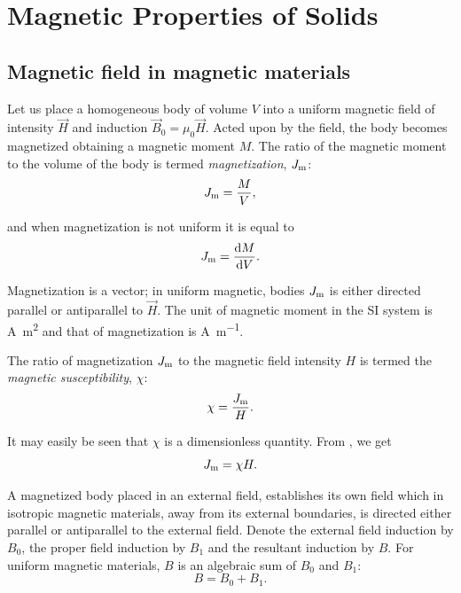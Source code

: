 

\chapter[Magnetic Properties of Solids]{Magnetic Properties of Solids}\label{chap:7}

\section{Magnetic field in magnetic materials}\label{sec:63}

Let us place a homogeneous body of volume $V$ into a uniform magnetic field of intensity $\vec{H}$ and induction $\vec{B}_0=\mu_0\vec{H}$. Acted upon by the field, the body becomes magnetized obtaining a magnetic moment $M$. The ratio of the magnetic moment to the volume of the body is termed \textit{magnetization}, $J_{\text{m}}$:
\begin{equation}\label{eq:7_1}
    J_{\text{m}} = \frac{M}{V},
\end{equation}

\noindent
and when magnetization is not uniform it is equal to
\begin{equation}\label{eq:7_2}
    J_{\text{m}} = \dfrac{\mathrm{d} M}{\mathrm{d} V}.
\end{equation}

Magnetization is a vector; in uniform magnetic, bodies $J_{\text{m}}$ is either directed parallel or antiparallel to $\vec{H}$. The unit of magnetic moment in the SI system is \si{\ampere\metre\squared} and that of magnetization is \si{\ampere\per\metre}.

The ratio of magnetization $J_{\text{m}}$ to the magnetic field intensity $H$ is termed the \textit{magnetic susceptibility}, $\chi$:
\begin{equation}\label{eq:7_3}
    \chi = \frac{J_{\text{m}}}{H}.
\end{equation}

\noindent
It may easily be seen that $\chi$ is a dimensionless quantity. From , we get
\begin{equation}\label{eq:7_4}
    J_{\text{m}} = \chi H.
\end{equation}

A magnetized body placed in an external field, establishes its own field which in isotropic magnetic materials, away from its external boundaries, is directed either parallel or antiparallel to the external field. Denote the external field induction by $B_0$, the proper field induction by $B_1$ and the resultant induction by $B$. For uniform magnetic materials, $B$ is an algebraic sum of $B_0$ and $B_1$:
\begin{equation}\label{eq:7_5}
    B = B_0 + B_1.
\end{equation}

